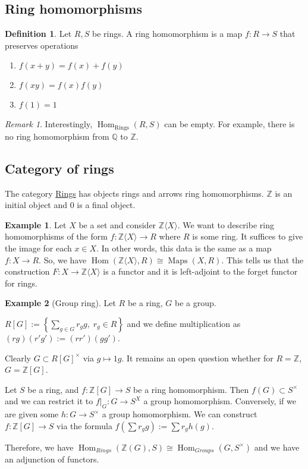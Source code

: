 \documentclass{article}
\newcommand\Z{\ensuremath{\mathbb{Z}}}
\newcommand\Q{\ensuremath{\mathbb{Q}}}
\DeclareMathOperator{\Hom}{Hom}
\DeclareMathOperator{\Maps}{Maps}
\theoremstyle{definition}
\newtheorem{definition}{Definition}[subsection]
\newtheorem{eg}{Example}[subsection]
\theoremstyle{remark}
\newtheorem*{remark}{Remark}
\theoremstyle{plain}
\begin{document}
\subsection{Ring homomorphisms}

\begin{definition}
    Let $R, S$ be rings. A ring homomorphism is a map $f: R \to S$ that preserves operations
    \begin{enumerate}
        \item $f(x+y) = f(x) + f(y)$
        \item $f(xy) = f(x)f(y)$
        \item $f(1) = 1$
    \end{enumerate}
\end{definition}

\begin{remark}
    Interestingly, $\Hom_{\mathrm{Rings}}(R,S)$ can be empty. For example, there is no ring homomorphism from $\Q$ to $\Z$. 
\end{remark}

\subsection{Category of rings}

The category \underline{Rings} has objects rings and arrows ring homomorphisms. $\Z$ is an initial object and $0$ is a final object. 

\begin{eg}
Let $X$ be a set and consider $\Z\langle X \rangle$. We want to describe ring homomorphisms of the form $f: \Z\langle X \rangle \to R$ where $R$ is some ring. It suffices to give the image for each $x \in X$. In other words, this data is the same as a map $f: X \to R$. So, we have $\Hom(\Z\langle X \rangle, R) \cong \Maps(X, R)$. This tells us that the construction $F: X\to \Z\langle X \rangle$ is a functor and it is left-adjoint to the forget functor for rings. 
\end{eg}

\begin{eg}[Group ring]
    Let $R$ be a ring, $G$ be a group. 

    $R[G]:= \left\{ \sum\limits_{g\in G} r_g  g, \; r_g \in R \right\}$ and we define multiplication as $(rg)(r'g') := (rr')(gg')$. 

    Clearly $G \subset R[G]^{\times}$ via $g \mapsto 1g$. It remains an open question whether for $R = \Z$, $G = \Z[G]$. 

    Let $S$ be a ring, and $f: \Z[G] \to S$ be a ring homomorphism. Then $f(G) \subset S^{\times}$ and we can restrict it to $f|_G:G\to S^{X}$ a group homomorphism. Conversely, if we are given some $h: G \to S^{\times}$ a group homomorphism. We can construct $f: \Z[G] \to S$ via the formula $f(\sum r_gg) := \sum r_g h(g)$.

    Therefore, we have $\Hom_{Rings}(\Z(G), S) \cong \Hom_{Groups}(G, S^{\times})$ and we have an adjunction of functors. 

\end{eg}
 
\end{document}
